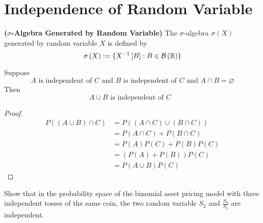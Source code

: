 \documentclass{report}
\begin{document}
\section{Independence of Random Variable}
\begin{definition}
\label{3.2.1}
\textbf{($\sigma$-Algebra Generated by Random Variable)} The $\sigma$-algebra $\sigma\left(X \right)$ generated by random variable $X$ is defined by
 \begin{equation*}
\sigma\left(X \right):=\{ X^{-1}\left[B \right]:B\in \mathcal{B}\left(\mathbb{R} \right) \}
\end{equation*}
\end{definition}
\begin{lemma}
\label{3.2.2}
Suppose 
\begin{equation*}
A\text{ is independent of }C\text{ and }B\text{ is independent of  }C\text{ and }A\cap B=\varnothing
\end{equation*}
Then
\begin{equation*}
A\cup B\text{ is independent of $C$ }
\end{equation*}
\end{lemma}
\begin{proof}
\begin{align*}
P\left(\left(A\cup B \right)\cap C \right)&=P\left(\left(A\cap C \right)\cup \left(B\cap C \right) \right)\\
&=P\left(A\cap C \right)+P\left(B\cap C \right)\\
&=P\left(A \right)P\left(C \right)+P\left(B \right)P\left(C \right)\\
&=\left(P\left(A \right)+P\left(B \right) \right)P\left(C \right)\\
&=P\left(A\cup B \right)P\left(C \right)
\end{align*}
\end{proof}
\begin{question}{}{}
Show that in the probability space of the binomial asset pricing model with three independent tosses of the same coin, the two random variable  $S_2$ and $\frac{S_3}{S_2}$ are independent.
\end{question}
\end{document}
